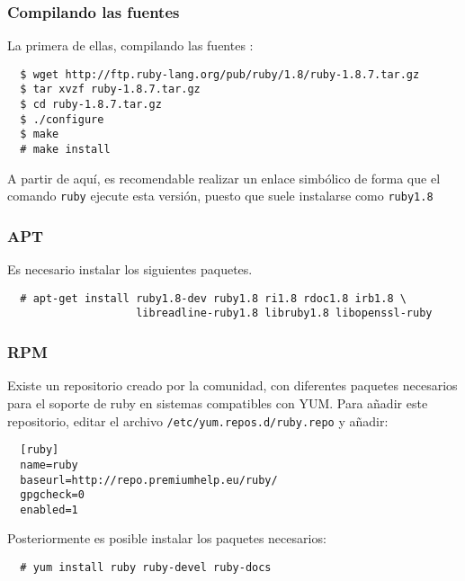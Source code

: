 \subsubsection{Compilando las fuentes} %
\label{ssub:compilando_las_fuentes}

 La primera de ellas, compilando las fuentes :

\begin{verbatim}
  $ wget http://ftp.ruby-lang.org/pub/ruby/1.8/ruby-1.8.7.tar.gz
  $ tar xvzf ruby-1.8.7.tar.gz
  $ cd ruby-1.8.7.tar.gz
  $ ./configure
  $ make
  # make install
\end{verbatim}

A partir de aquí, es recomendable realizar un enlace simbólico de forma que el comando \texttt{ruby} ejecute esta versión, puesto que suele instalarse como \texttt{ruby1.8}


\subsubsection{APT} %
\label{ssub:apt}

Es necesario instalar los siguientes paquetes.

\begin{verbatim}
  # apt-get install ruby1.8-dev ruby1.8 ri1.8 rdoc1.8 irb1.8 \
                    libreadline-ruby1.8 libruby1.8 libopenssl-ruby
\end{verbatim}


\subsubsection{RPM} %
\label{ssub:rpm}

Existe un repositorio creado por la comunidad, con diferentes paquetes necesarios para el soporte de ruby en sistemas compatibles con YUM. Para añadir este repositorio, editar el archivo \texttt{/etc/yum.repos.d/ruby.repo} y añadir:

\begin{verbatim}
  [ruby]
  name=ruby
  baseurl=http://repo.premiumhelp.eu/ruby/
  gpgcheck=0
  enabled=1
\end{verbatim}

Posteriormente es posible instalar los paquetes necesarios:

\begin{verbatim}
  # yum install ruby ruby-devel ruby-docs
\end{verbatim}

